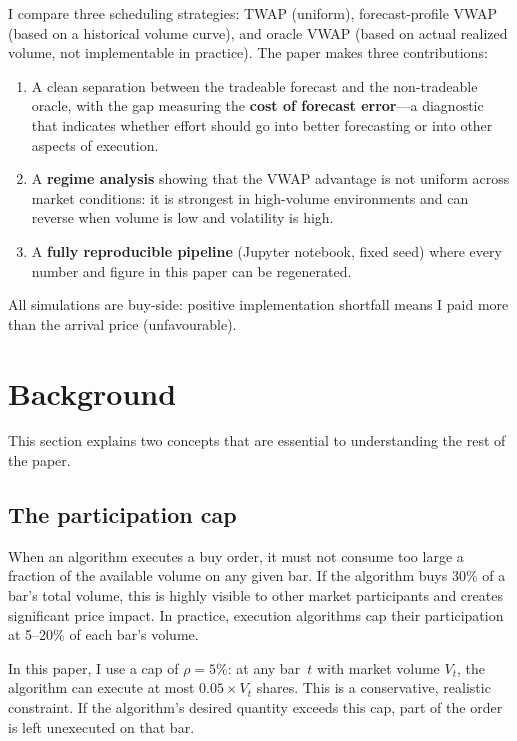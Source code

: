 \documentclass[10pt,twocolumn]{article}
\begin{document}
I compare three scheduling strategies: TWAP (uniform), forecast-profile VWAP (based on a historical volume curve), and oracle VWAP (based on actual realized volume, not implementable in practice). The paper makes three contributions:
\begin{enumerate}[nosep]
\item A clean separation between the tradeable forecast and the non-tradeable oracle, with the gap measuring the \textbf{cost of forecast error}---a diagnostic that indicates whether effort should go into better forecasting or into other aspects of execution.
\item A \textbf{regime analysis} showing that the VWAP advantage is not uniform across market conditions: it is strongest in high-volume environments and can reverse when volume is low and volatility is high.
\item A \textbf{fully reproducible pipeline} (Jupyter notebook, fixed seed) where every number and figure in this paper can be regenerated.
\end{enumerate}

All simulations are buy-side: positive implementation shortfall means I paid more than the arrival price (unfavourable).


\section{Background}

This section explains two concepts that are essential to understanding the rest of the paper.

\subsection{The participation cap}

When an algorithm executes a buy order, it must not consume too large a fraction of the available volume on any given bar. If the algorithm buys 30\% of a bar's total volume, this is highly visible to other market participants and creates significant price impact. In practice, execution algorithms cap their participation at 5--20\% of each bar's volume.

In this paper, I use a cap of $\rho = 5\%$: at any bar~$t$ with market volume $V_t$, the algorithm can execute at most $0.05 \times V_t$ shares. This is a conservative, realistic constraint. If the algorithm's desired quantity exceeds this cap, part of the order is left unexecuted on that bar.
\end{document}
